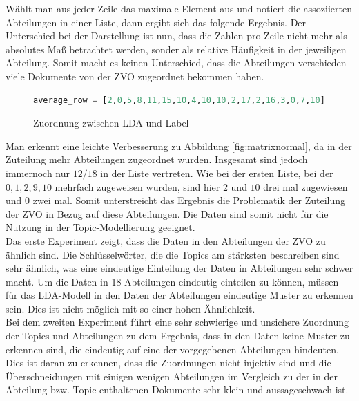 \documentclass[german,version-2020-11]{uzl-thesis}
\begin{document}
Wählt man aus jeder Zeile das maximale Element aus und notiert die assoziierten Abteilungen in einer Liste, dann ergibt sich das folgende Ergebnis. Der Unterschied bei der Darstellung ist nun, dass die Zahlen pro Zeile nicht mehr als absolutes Maß betrachtet werden, sonder als relative Häufigkeit in der jeweiligen Abteilung. Somit macht es keinen Unterschied, dass die Abteilungen verschieden viele Dokumente von der ZVO zugeordnet bekommen haben. \\

\begin{figure}[h]
\begin{center}
\begin{lstlisting}[language=Python]
average_row = [2,0,5,8,11,15,10,4,10,10,2,17,2,16,3,0,7,10]
\end{lstlisting}
\caption{Zuordnung zwischen LDA und Label} 
\end{center}
\end{figure}

Man erkennt eine leichte Verbesserung zu Abbildung \ref{fig:matrixnormal}, da in der Zuteilung mehr Abteilungen zugeordnet wurden. Insgesamt sind jedoch immernoch nur $12/18$ in der Liste vertreten. Wie bei der ersten Liste, bei der  $ 0,1,2,9,10 $ mehrfach zugeweisen wurden, sind hier $2$ und $10$ drei mal zugewiesen und $0$ zwei mal. Somit unterstreicht das Ergebnis die Problematik der Zuteilung der ZVO in Bezug auf diese Abteilungen. Die Daten sind somit nicht für die Nutzung in der Topic-Modellierung geeignet.\\


Das erste Experiment zeigt, dass die Daten in den Abteilungen der ZVO zu ähnlich sind. Die Schlüsselwörter, die die Topics am stärksten beschreiben sind sehr ähnlich, was eine eindeutige Einteilung der Daten in Abteilungen sehr schwer macht. Um die Daten in 18 Abteilungen eindeutig einteilen zu können, müssen für das LDA-Modell in den Daten der Abteilungen eindeutige Muster zu erkennen sein. Dies ist nicht möglich mit so einer hohen Ähnlichkeit.\\


Bei dem zweiten Experiment führt eine sehr schwierige und unsichere Zuordnung der Topics und Abteilungen zu dem Ergebnis, dass in den Daten keine Muster zu erkennen sind, die eindeutig auf eine der vorgegebenen Abteilungen hindeuten. Dies ist daran zu erkennen, dass die Zuordnungen nicht injektiv sind und die Überschneidungen mit einigen wenigen Abteilungen im Vergleich zu der in der Abteilung bzw. Topic enthaltenen Dokumente sehr klein und aussageschwach ist. 
\end{document}
